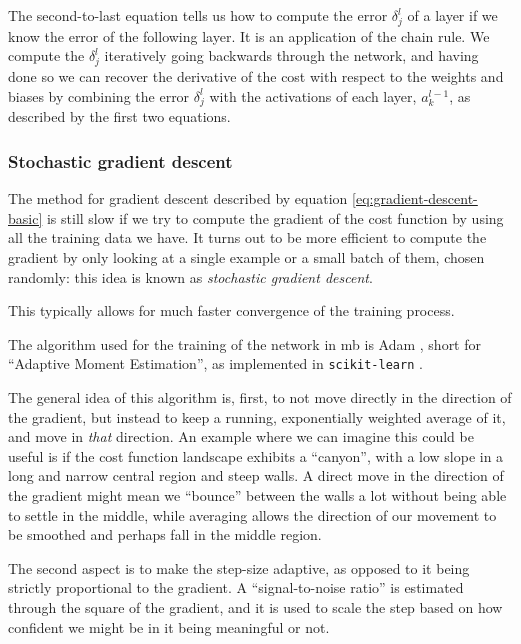 \documentclass[main.tex]{subfiles}
\begin{document}
The second-to-last equation tells us how to compute the error \(\delta^{l}_{j}\) of a layer if we know the error of the following layer. 
It is an application of the chain rule. 
We compute the \(\delta^{l}_{j}\) iteratively going backwards through the network, and having done so we can recover the derivative of the cost with respect to the weights and biases by combining the error \(\delta^{l}_{j}\) with the activations of each layer, \(a^{l-1}_{k}\), as described by the first two equations. 

\subsubsection{Stochastic gradient descent}

The method for gradient descent described by equation \ref{eq:gradient-descent-basic} is still slow if we try to compute the gradient of the cost function by using all the training data we have. 
It turns out to be more efficient to compute the gradient by only looking at a single example or a small batch of them, chosen randomly: this idea is known as \emph{stochastic gradient descent}. 

This typically allows for much faster convergence of the training process.

The algorithm used for the training of the network in \acs{mb} is Adam \cite{kingmaAdamMethodStochastic2017,ruderOverviewGradientDescent2016}, short for ``Adaptive Moment Estimation'', as implemented in \texttt{scikit-learn} \cite[]{pedregosaScikitlearnMachineLearning2011}. 

The general idea of this algorithm is, first, to not move directly in the direction of the gradient, but instead to keep a running, exponentially weighted average of it, and move in \emph{that} direction. 
An example where we can imagine this could be useful is if the cost function landscape exhibits a ``canyon'', with a low slope in a long and narrow central region and steep walls. 
A direct move in the direction of the gradient might mean we ``bounce'' between the walls a lot without being able to settle in the middle, while averaging allows the direction of our movement to be smoothed and perhaps fall in the middle region. 

The second aspect is to make the step-size adaptive, as opposed to it being strictly proportional to the gradient.
A ``signal-to-noise ratio'' is estimated through the square of the gradient, and it is used to scale the step based on how confident we might be in it being meaningful or not. 
\end{document}
